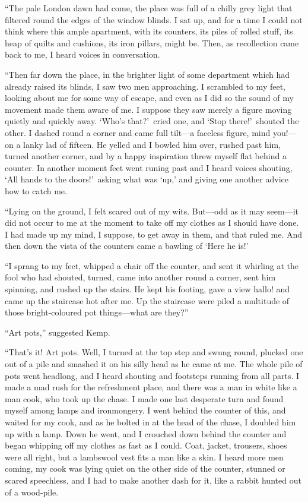“The pale London dawn had come, the place was full of a chilly grey light that filtered round the edges of the window blinds. I sat up, and for a time I could not think where this ample apartment, with its counters, its piles of rolled stuff, its heap of quilts and cushions, its iron pillars, might be. Then, as recollection came back to me, I heard voices in conversation.

“Then far down the place, in the brighter light of some department which had already raised its blinds, I saw two men approaching. I scrambled to my feet, looking about me for some way of escape, and even as I did so the sound of my movement made them aware of me. I suppose they saw merely a figure moving quietly and quickly away. ‘Who’s that?’\ cried one, and ‘Stop there!’\ shouted the other. I dashed round a corner and came full tilt—a faceless figure, mind you!—on a lanky lad of fifteen. He yelled and I bowled him over, rushed past him, turned another corner, and by a happy inspiration threw myself flat behind a counter. In another moment feet went runing past and I heard voices shouting, ‘All hands to the doors!’\ asking what was ‘up,’ and giving one another advice how to catch me.

“Lying on the ground, I felt scared out of my wits. But—odd as it may seem—it did not occur to me at the moment to take off my clothes as I should have done. I had made up my mind, I suppose, to get away in them, and that ruled me. And then down the vista of the counters came a bawling of ‘Here he is!’

“I sprang to my feet, whipped a chair off the counter, and sent it whirling at the fool who had shouted, turned, came into another round a corner, sent him spinning, and rushed up the stairs. He kept his footing, gave a view hallo! and came up the staircase hot after me. Up the staircase were piled a multitude of those bright-coloured pot things—what are they?”

“Art pots,” suggested Kemp.

“That’s it! Art pots. Well, I turned at the top step and swung round, plucked one out of a pile and smashed it on his silly head as he came at me. The whole pile of pots went headlong, and I heard shouting and footsteps running from all parts. I made a mad rush for the refreshment place, and there was a man in white like a man cook, who took up the chase. I made one last desperate turn and found myself among lamps and ironmongery. I went behind the counter of this, and waited for my cook, and as he bolted in at the head of the chase, I doubled him up with a lamp. Down he went, and I crouched down behind the counter and began whipping off my clothes as fast as I could. Coat, jacket, trousers, shoes were all right, but a lambswool vest fits a man like a skin. I heard more men coming, my cook was lying quiet on the other side of the counter, stunned or scared speechless, and I had to make another dash for it, like a rabbit hunted out of a wood-pile.

